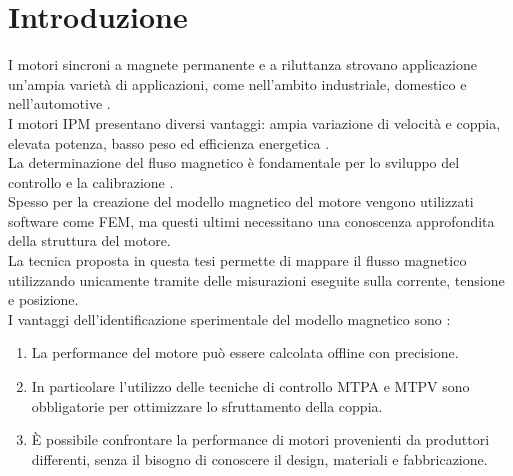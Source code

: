 \chapter{Introduzione}
I motori sincroni a magnete permanente e a riluttanza strovano applicazione un'ampia varietà di applicazioni, come nell'ambito industriale, domestico e  nell'automotive \cite{bojoi2024}.\\
I motori IPM presentano diversi vantaggi: ampia variazione di velocità e coppia, elevata potenza, basso peso ed efficienza energetica \cite{Hwang}.\\
La determinazione del fluso magnetico è fondamentale per lo sviluppo del controllo e la calibrazione \cite{bojoi2024}.\\
Spesso per la creazione del modello magnetico del motore vengono utilizzati software come FEM, ma questi ultimi necessitano una conoscenza approfondita della struttura del motore. \\
La tecnica proposta in questa tesi permette di mappare il flusso magnetico utilizzando unicamente tramite delle misurazioni eseguite sulla corrente, tensione e posizione.\\
I vantaggi dell'identificazione sperimentale del modello magnetico sono \cite{Armando}:
\begin{enumerate}
\item La performance del motore può essere calcolata offline con precisione.
\item In particolare l'utilizzo delle tecniche di controllo MTPA e MTPV sono obbligatorie per ottimizzare lo sfruttamento della coppia.
\item È possibile confrontare la performance di motori provenienti da produttori differenti, senza il bisogno di conoscere il design, materiali e fabbricazione.
\end{enumerate}


 

